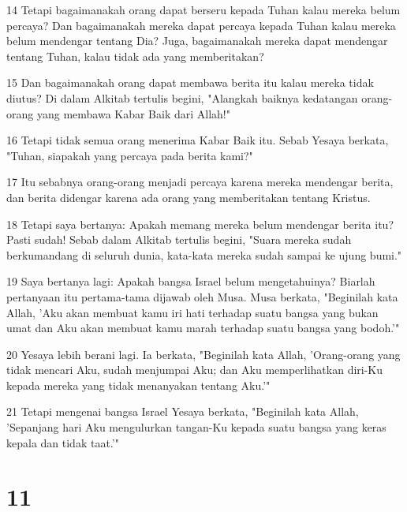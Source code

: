 \par 14 Tetapi bagaimanakah orang dapat berseru kepada Tuhan kalau mereka belum percaya? Dan bagaimanakah mereka dapat percaya kepada Tuhan kalau mereka belum mendengar tentang Dia? Juga, bagaimanakah mereka dapat mendengar tentang Tuhan, kalau tidak ada yang memberitakan?
\par 15 Dan bagaimanakah orang dapat membawa berita itu kalau mereka tidak diutus? Di dalam Alkitab tertulis begini, "Alangkah baiknya kedatangan orang-orang yang membawa Kabar Baik dari Allah!"
\par 16 Tetapi tidak semua orang menerima Kabar Baik itu. Sebab Yesaya berkata, "Tuhan, siapakah yang percaya pada berita kami?"
\par 17 Itu sebabnya orang-orang menjadi percaya karena mereka mendengar berita, dan berita didengar karena ada orang yang memberitakan tentang Kristus.
\par 18 Tetapi saya bertanya: Apakah memang mereka belum mendengar berita itu? Pasti sudah! Sebab dalam Alkitab tertulis begini, "Suara mereka sudah berkumandang di seluruh dunia, kata-kata mereka sudah sampai ke ujung bumi."
\par 19 Saya bertanya lagi: Apakah bangsa Israel belum mengetahuinya? Biarlah pertanyaan itu pertama-tama dijawab oleh Musa. Musa berkata, "Beginilah kata Allah, 'Aku akan membuat kamu iri hati terhadap suatu bangsa yang bukan umat dan Aku akan membuat kamu marah terhadap suatu bangsa yang bodoh.'"
\par 20 Yesaya lebih berani lagi. Ia berkata, "Beginilah kata Allah, 'Orang-orang yang tidak mencari Aku, sudah menjumpai Aku; dan Aku memperlihatkan diri-Ku kepada mereka yang tidak menanyakan tentang Aku.'"
\par 21 Tetapi mengenai bangsa Israel Yesaya berkata, "Beginilah kata Allah, 'Sepanjang hari Aku mengulurkan tangan-Ku kepada suatu bangsa yang keras kepala dan tidak taat.'"

\chapter{11}

